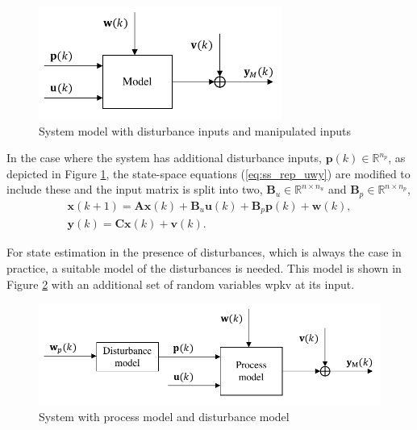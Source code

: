 \begin{figure}[ht]
	\centering
	\includegraphics[width=8cm]{images/model_diag_upwvy.pdf}
	\caption{System model with disturbance inputs and manipulated inputs}
	\label{fig:model_diag_upwvy}
\end{figure}
In the case where the system has additional disturbance inputs, $\mathbf{p}(k) \in \mathbb{R}^{n_p}$, as depicted in Figure \ref{fig:model_diag_upwvy}, the state-space equations (\ref{eq:ss_rep_uwy}) are modified to include these and the input matrix is split into two, $\mathbf{B}_u \in \mathbb{R}^{n \times n_u}$ and $\mathbf{B}_p \in \mathbb{R}^{n \times n_p}$,
\begin{equation} \label{eq:ss_rep_upwy}
	\begin{aligned}
		\mathbf{x}(k+1) = \mathbf{A} \mathbf{x}(k) + \mathbf{B}_u \mathbf{u}(k) + \mathbf{B}_p \mathbf{p}(k) + \mathbf{w}(k), \\
		\mathbf{y}(k) = \mathbf{C} \mathbf{x}(k) + \mathbf{v}(k).
	\end{aligned}
\end{equation}

For state estimation in the presence of disturbances, which is always the case in practice, a suitable model of the disturbances is needed. This model is shown in Figure \ref{fig:model_diag_wpupwvy} with an additional set of random variables \gls{wpkv} at its input.
\begin{figure}[ht]
	\centering
	\includegraphics[width=12.5cm]{images/model_diag_wpupwvy.pdf}
	\caption{System with process model and disturbance model}
	\label{fig:model_diag_wpupwvy}
\end{figure}

